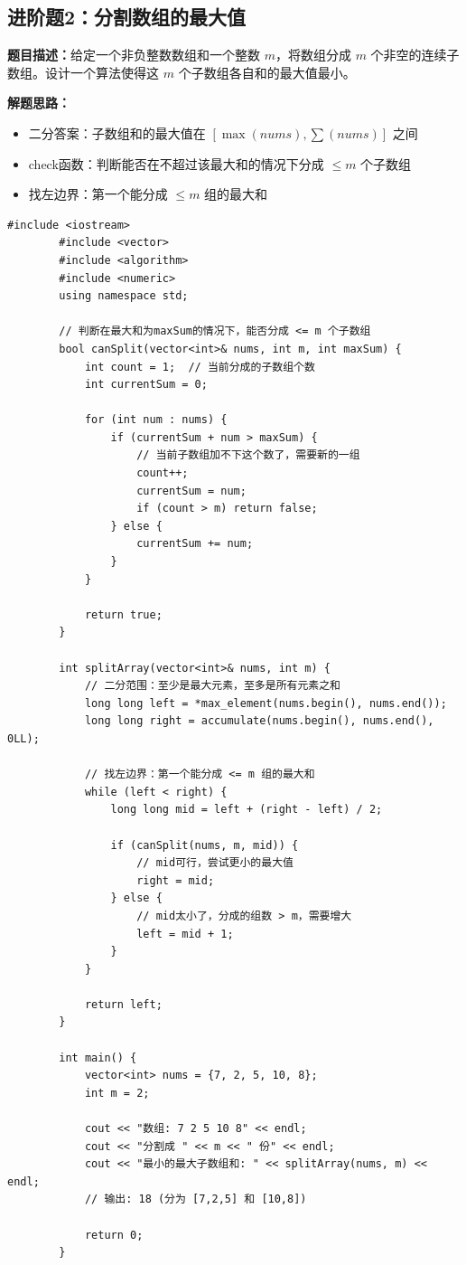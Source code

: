\documentclass[12pt,a4paper]{article}
\begin{document}
	\subsection{进阶题2：分割数组的最大值}
	
	\textbf{题目描述：}给定一个非负整数数组和一个整数 $m$，将数组分成 $m$ 个非空的连续子数组。设计一个算法使得这 $m$ 个子数组各自和的最大值最小。
	
	\textbf{解题思路：}
	\begin{itemize}
		\item 二分答案：子数组和的最大值在 $[\max(nums), \sum(nums)]$ 之间
		\item check函数：判断能否在不超过该最大和的情况下分成 $\leq m$ 个子数组
		\item 找左边界：第一个能分成 $\leq m$ 组的最大和
	\end{itemize}
	
	\begin{lstlisting}[caption={进阶题2：分割数组的最大值最小化}]
		#include <iostream>
		#include <vector>
		#include <algorithm>
		#include <numeric>
		using namespace std;
		
		// 判断在最大和为maxSum的情况下，能否分成 <= m 个子数组
		bool canSplit(vector<int>& nums, int m, int maxSum) {
			int count = 1;  // 当前分成的子数组个数
			int currentSum = 0;
			
			for (int num : nums) {
				if (currentSum + num > maxSum) {
					// 当前子数组加不下这个数了，需要新的一组
					count++;
					currentSum = num;
					if (count > m) return false;
				} else {
					currentSum += num;
				}
			}
			
			return true;
		}
		
		int splitArray(vector<int>& nums, int m) {
			// 二分范围：至少是最大元素，至多是所有元素之和
			long long left = *max_element(nums.begin(), nums.end());
			long long right = accumulate(nums.begin(), nums.end(), 0LL);
			
			// 找左边界：第一个能分成 <= m 组的最大和
			while (left < right) {
				long long mid = left + (right - left) / 2;
				
				if (canSplit(nums, m, mid)) {
					// mid可行，尝试更小的最大值
					right = mid;
				} else {
					// mid太小了，分成的组数 > m，需要增大
					left = mid + 1;
				}
			}
			
			return left;
		}
		
		int main() {
			vector<int> nums = {7, 2, 5, 10, 8};
			int m = 2;
			
			cout << "数组: 7 2 5 10 8" << endl;
			cout << "分割成 " << m << " 份" << endl;
			cout << "最小的最大子数组和: " << splitArray(nums, m) << endl;
			// 输出: 18 (分为 [7,2,5] 和 [10,8])
			
			return 0;
		}
	\end{lstlisting}
	
\end{document}
